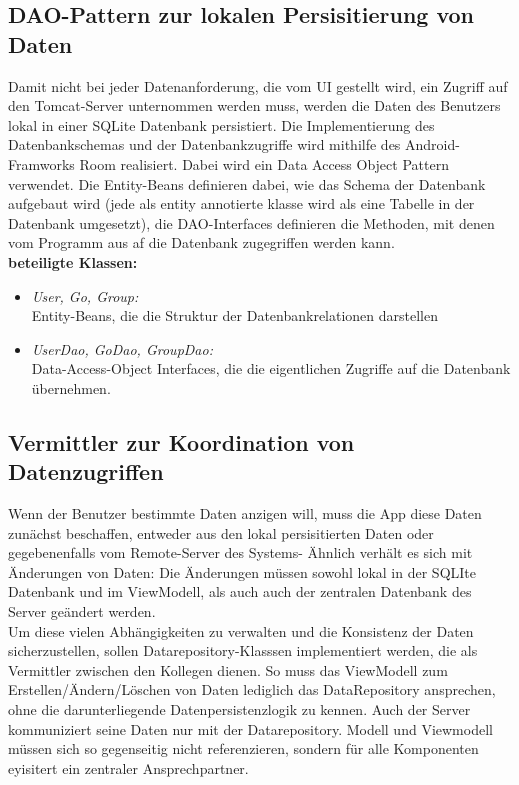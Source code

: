 \documentclass[parskip=full]{scrartcl}
\begin{document}
\subsection{DAO-Pattern zur lokalen Persisitierung von Daten}
Damit nicht bei jeder Datenanforderung, die vom UI gestellt wird, ein Zugriff auf den Tomcat-Server unternommen werden muss, werden die Daten des Benutzers lokal in einer SQLite Datenbank persistiert. Die Implementierung des Datenbankschemas und der Datenbankzugriffe wird mithilfe des Android-Framworks Room realisiert. Dabei wird ein Data Access Object Pattern verwendet.
Die Entity-Beans definieren dabei, wie das Schema der Datenbank aufgebaut wird (jede als entity annotierte klasse wird als eine Tabelle in der Datenbank umgesetzt), die DAO-Interfaces definieren die Methoden, mit denen vom Programm aus af die Datenbank zugegriffen werden kann.\\

\textbf{beteiligte Klassen:}\\
\begin{itemize}
	\item \textit{User, Go, Group:}\\ Entity-Beans, die die Struktur der Datenbankrelationen darstellen
	\item \textit{UserDao, GoDao, GroupDao:}\\ Data-Access-Object Interfaces, die die eigentlichen Zugriffe auf die Datenbank übernehmen.
\end{itemize}

\subsection{Vermittler zur Koordination von Datenzugriffen}
Wenn der Benutzer bestimmte Daten anzigen will, muss die App diese Daten zunächst beschaffen, entweder aus den lokal persisitierten Daten oder gegebenenfalls vom Remote-Server des Systems- Ähnlich verhält es sich mit Änderungen von Daten: Die Änderungen müssen sowohl lokal in der SQLIte Datenbank und im ViewModell, als auch auch der zentralen Datenbank des Server geändert werden.\\
Um diese vielen Abhängigkeiten zu verwalten und die Konsistenz der Daten sicherzustellen, sollen Datarepository-Klasssen implementiert werden, die als Vermittler zwischen den Kollegen dienen.
So muss das ViewModell zum Erstellen/Ändern/Löschen von Daten lediglich das DataRepository ansprechen, ohne die darunterliegende Datenpersistenzlogik zu kennen. Auch der Server kommuniziert seine Daten nur mit der Datarepository. Modell und Viewmodell müssen sich so gegenseitig nicht referenzieren, sondern für alle Komponenten eyisitert ein zentraler Ansprechpartner.\\
\end{document}

